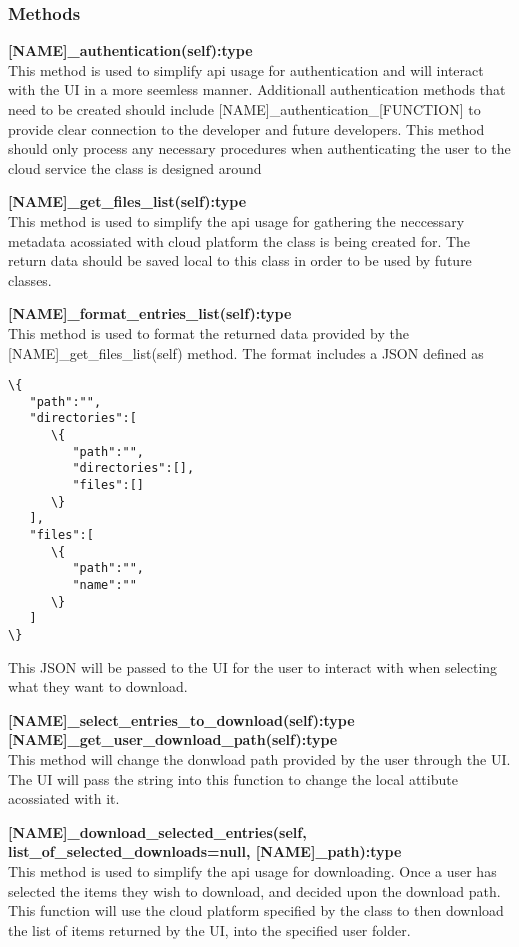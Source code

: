 \subsubsection{Methods}
\textbf{[NAME]\_authentication(self):type} \\
This method is used to simplify api usage for authentication and will interact with the UI in a more seemless manner. Additionall authentication
methods that need to be created should include [NAME]\_authentication\_[FUNCTION] to provide clear connection to the developer and future 
developers. This method should only process any necessary procedures when authenticating the user to the cloud service the class is designed around

\textbf{[NAME]\_get\_files\_list(self):type} \\
This method is used to simplify the api usage for gathering the neccessary metadata acossiated with cloud platform the class is being created for.
The return data should be saved local to this class in order to be used by future classes. 

\textbf{[NAME]\_format\_entries\_list(self):type} \\
This method is used to format the returned data provided by the [NAME]\_get\_files\_list(self) method. The format includes a JSON defined as 
\begin{verbatim}
\{
   "path":"",
   "directories":[
      \{
         "path":"",
         "directories":[],
         "files":[]
      \}
   ],
   "files":[
      \{
         "path":"",
         "name":""
      \}
   ]
\}
\end{verbatim}
This JSON will be passed to the UI for the user to interact with when selecting what they want to download.

\textbf{[NAME]\_select\_entries\_to\_download(self):type} \\

\textbf{[NAME]\_get\_user\_download\_path(self):type} \\
This method will change the donwload path provided by the user through the UI. The UI will pass the string into this function to change the
local attibute acossiated with it.

\textbf{[NAME]\_download\_selected\_entries(self, list\_of\_selected\_downloads=null, [NAME]\_path):type} \\
This method is used to simplify the api usage for downloading. Once a user has selected the items they wish to download, and decided upon the 
download path. This function will use the cloud platform specified by the class to then download the list of items returned by the UI, into the 
specified user folder.

